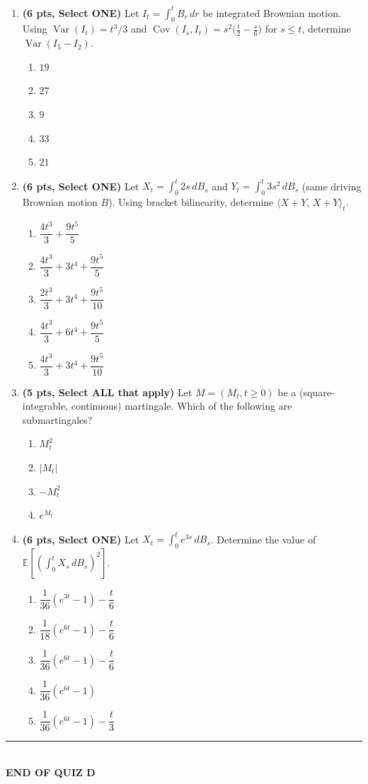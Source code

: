 \documentclass[11pt]{article}
\newcommand{\E}{\mathbb{E}}
\DeclareMathOperator{\Var}{Var}
\DeclareMathOperator{\Cov}{Cov}
\begin{document}
\begin{enumerate}
\item[\textbf{Q13.}] \textbf{(6 pts, Select ONE)} Let $I_t=\int_0^tB_r\,dr$ be integrated Brownian motion. Using $\Var(I_t)=t^3/3$ and $\Cov(I_s,I_t)=s^2\big(\tfrac t2-\tfrac s6\big)$ for $s\le t$, determine $\Var(I_5-I_2)$.
\begin{enumerate}
  \item $19$
  \item $27$
  \item $9$
  \item $33$
  \item $21$
\end{enumerate}

\item[\textbf{Q14.}] \textbf{(6 pts, Select ONE)} Let $X_t=\int_0^t2s\,dB_s$ and $Y_t=\int_0^t3s^2\,dB_s$ (same driving Brownian motion $B$). Using bracket bilinearity, determine $\langle X+Y,\,X+Y\rangle_t$.
\begin{enumerate}
  \item $\dfrac{4t^3}3+\dfrac{9t^5}5$
  \item $\dfrac{4t^3}3+3t^4+\dfrac{9t^5}5$
  \item $\dfrac{2t^3}3+3t^4+\dfrac{9t^5}{10}$
  \item $\dfrac{4t^3}3+6t^4+\dfrac{9t^5}5$
  \item $\dfrac{4t^3}3+3t^4+\dfrac{9t^5}{10}$
\end{enumerate}

\item[\textbf{Q15.}] \textbf{(5 pts, Select ALL that apply)} Let $M=(M_t,t\ge0)$ be a (square-integrable, continuous) martingale. Which of the following are submartingales?
\begin{enumerate}
  \item $M_t^2$
  \item $|M_t|$
  \item $-M_t^2$
  \item $e^{M_t}$
\end{enumerate}

\item[\textbf{Q16.}] \textbf{(6 pts, Select ONE)} Let $X_t=\int_0^te^{3s}\,dB_s$. Determine the value of $\displaystyle\E\left[\left(\int_0^tX_s\,dB_s\right)^2\right]$.
\begin{enumerate}
  \item $\dfrac1{36}(e^{3t}-1)-\dfrac t6$
  \item $\dfrac1{18}(e^{6t}-1)-\dfrac t6$
  \item $\dfrac1{36}(e^{6t}-1)-\dfrac t6$
  \item $\dfrac1{36}(e^{6t}-1)$
  \item $\dfrac1{36}(e^{6t}-1)-\dfrac t3$
\end{enumerate}

\end{enumerate}

\vspace{10pt}
\begin{center}\rule{0.5\textwidth}{0.4pt}\\[2pt]\textbf{END OF QUIZ D}\end{center}
\end{document}
